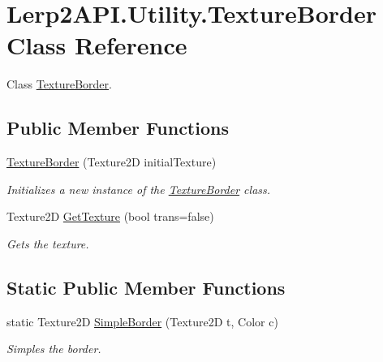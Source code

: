 \hypertarget{class_lerp2_a_p_i_1_1_utility_1_1_texture_border}{}\section{Lerp2\+A\+P\+I.\+Utility.\+Texture\+Border Class Reference}
\label{class_lerp2_a_p_i_1_1_utility_1_1_texture_border}


Class \hyperlink{class_lerp2_a_p_i_1_1_utility_1_1_texture_border}{Texture\+Border}.  


\subsection*{Public Member Functions}
\begin{DoxyCompactItemize}
\item 
\hyperlink{class_lerp2_a_p_i_1_1_utility_1_1_texture_border_a6027a401443b51f04e868ecf2ec47665}{Texture\+Border} (Texture2D initial\+Texture)
\begin{DoxyCompactList}\small\item\em Initializes a new instance of the \hyperlink{class_lerp2_a_p_i_1_1_utility_1_1_texture_border}{Texture\+Border} class. \end{DoxyCompactList}\item 
Texture2D \hyperlink{class_lerp2_a_p_i_1_1_utility_1_1_texture_border_a60d2f15bfd5e17848c6e93b34cddad7c}{Get\+Texture} (bool trans=false)
\begin{DoxyCompactList}\small\item\em Gets the texture. \end{DoxyCompactList}\end{DoxyCompactItemize}
\subsection*{Static Public Member Functions}
\begin{DoxyCompactItemize}
\item 
static Texture2D \hyperlink{class_lerp2_a_p_i_1_1_utility_1_1_texture_border_aae0c5d1b848aa03831514ab53e2943c0}{Simple\+Border} (Texture2D t, Color c)
\begin{DoxyCompactList}\small\item\em Simples the border. \end{DoxyCompactList}\end{DoxyCompactItemize}

